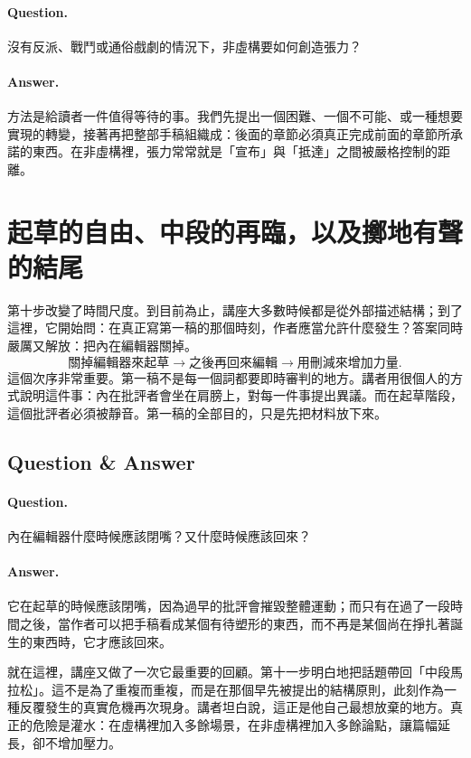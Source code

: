 \paragraph{Question.} 沒有反派、戰鬥或通俗戲劇的情況下，非虛構要如何創造張力？

\paragraph{Answer.} 方法是給讀者一件值得等待的事。我們先提出一個困難、一個不可能、或一種想要實現的轉變，接著再把整部手稿組織成：後面的章節必須真正完成前面的章節所承諾的東西。在非虛構裡，張力常常就是「宣布」與「抵達」之間被嚴格控制的距離。

\section{起草的自由、中段的再臨，以及擲地有聲的結尾}

第十步改變了時間尺度。到目前為止，講座大多數時候都是從外部描述結構；到了這裡，它開始問：在真正寫第一稿的那個時刻，作者應當允許什麼發生？答案同時嚴厲又解放：把內在編輯器關掉。
\begin{equation}
\text{關掉編輯器來起草} \to \text{之後再回來編輯} \to \text{用刪減來增加力量}.
\end{equation}
這個次序非常重要。第一稿不是每一個詞都要即時審判的地方。講者用很個人的方式說明這件事：內在批評者會坐在肩膀上，對每一件事提出異議。而在起草階段，這個批評者必須被靜音。第一稿的全部目的，只是先把材料放下來。

\subsection{Question \& Answer}

\paragraph{Question.} 內在編輯器什麼時候應該閉嘴？又什麼時候應該回來？

\paragraph{Answer.} 它在起草的時候應該閉嘴，因為過早的批評會摧毀整體運動；而只有在過了一段時間之後，當作者可以把手稿看成某個有待塑形的東西，而不再是某個尚在掙扎著誕生的東西時，它才應該回來。

就在這裡，講座又做了一次它最重要的回顧。第十一步明白地把話題帶回「中段馬拉松」。這不是為了重複而重複，而是在那個早先被提出的結構原則，此刻作為一種反覆發生的真實危機再次現身。講者坦白說，這正是他自己最想放棄的地方。真正的危險是灌水：在虛構裡加入多餘場景，在非虛構裡加入多餘論點，讓篇幅延長，卻不增加壓力。

